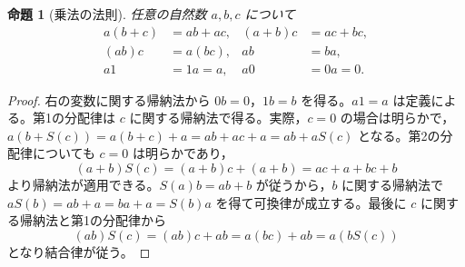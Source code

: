 \documentclass[a5paper,10pt,dvipdfmx]{jsarticle}
\theoremstyle{definition}
\theoremstyle{plain}
\newtheorem{prop}[ruledef]{命題}
\begin{document}
\begin{prop}[乗法の法則]\label{k109}
任意の自然数 $a,b,c$ について
\begin{align*}
 a(b+c)&=ab+ac,&(a+b)c&=ac+bc,\\
 (ab)c&=a(bc),&ab&=ba,\\
 a1&=1a=a,&a0&=0a=0.
\end{align*}
\end{prop}
\begin{proof}
右の変数に関する帰納法から $0b=0$，$1b=b$ を得る。$a1=a$ は定義による。第1の分配律は $c$ に関する帰納法で得る。実際，$c=0$ の場合は明らかで，$a(b+S(c))=a(b+c)+a=ab+ac+a=ab+aS(c)$ となる。第2の分配律についても $c=0$ は明らかであり，
\[(a+b)S(c)=(a+b)c+(a+b)=ac+a+bc+b\]
より帰納法が適用できる。$S(a)b=ab+b$ が従うから，$b$ に関する帰納法で $aS(b)=ab+a=ba+a=S(b)a$ を得て可換律が成立する。最後に $c$ に関する帰納法と第1の分配律から
\[(ab)S(c)=(ab)c+ab=a(bc)+ab=a(bS(c))\]
となり結合律が従う。
\end{proof}
\end{document}
